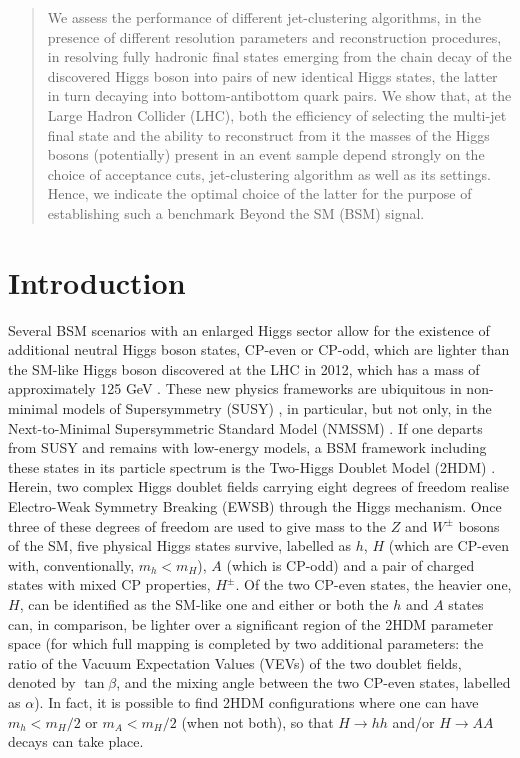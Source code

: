 \documentclass[12pt]{article}
\begin{document}
\begin{abstract}
\noindent
{We assess the performance of different jet-clustering algorithms, in the presence of different resolution parameters and reconstruction procedures, in resolving fully hadronic final states emerging from the chain decay of the discovered Higgs boson into pairs of new identical Higgs states, the latter in turn decaying into bottom-antibottom quark pairs. We show that, at the Large Hadron Collider (LHC), both the efficiency of selecting the multi-jet final state and the ability to reconstruct from it the masses of the Higgs bosons (potentially) present in an event sample depend strongly on the choice of acceptance cuts,
jet-clustering algorithm as well as its settings. Hence, we indicate the optimal choice of the latter for the purpose of establishing such a benchmark Beyond the SM (BSM) signal.}
 \end{abstract}
\thispagestyle{empty}
\vfill
\newpage
\section{Introduction}
Several BSM scenarios with an enlarged Higgs sector allow for the existence of additional neutral Higgs boson states,
CP-even or CP-odd, which are lighter than the SM-like Higgs boson  discovered at the LHC in 2012, which has a mass of approximately 125 GeV \cite{Aad:2012tfa}. These new physics frameworks are ubiquitous in non-minimal models of Supersymmetry (SUSY) \cite{Book}, in particular, but not only, in the Next-to-Minimal Supersymmetric Standard Model (NMSSM) \cite{Ellwanger:2009dp}. If one departs from SUSY and remains with low-energy models, a BSM framework including these states in its particle spectrum is  the Two-Higgs Doublet Model (2HDM) \cite{Gunion:1989we,Gunion:1992hs,Branco:2011iw}. Herein,
two  complex Higgs doublet fields carrying eight degrees of freedom realise Electro-Weak Symmetry Breaking (EWSB) through the Higgs mechanism. Once three of these degrees of freedom are used to give mass to the $Z$ and $W^\pm$ bosons of the SM, five physical Higgs states survive, labelled as $h$, $H$ (which are CP-even with, conventionally, $m_h<m_H$), $A$ (which is CP-odd) and a pair of charged states with mixed CP properties, $H^\pm$. Of the two CP-even states, the heavier one, $H$,  can be identified as the SM-like one and either or both the $h$ and $A$ states can, in comparison, be lighter over a significant region of the 2HDM parameter space (for which full mapping is completed by two additional parameters: the ratio of the Vacuum Expectation Values (VEVs) of the two
doublet fields, denoted by $\tan\beta$, and the mixing angle between the two CP-even states, labelled as $\alpha$). In fact, it is possible to find 2HDM configurations where one can have  $m_h<m_H/2$ or $m_A<m_H/2$ (when not both), so that $H\to hh$ and/or $H\to AA$ decays can take place.
\end{document}

